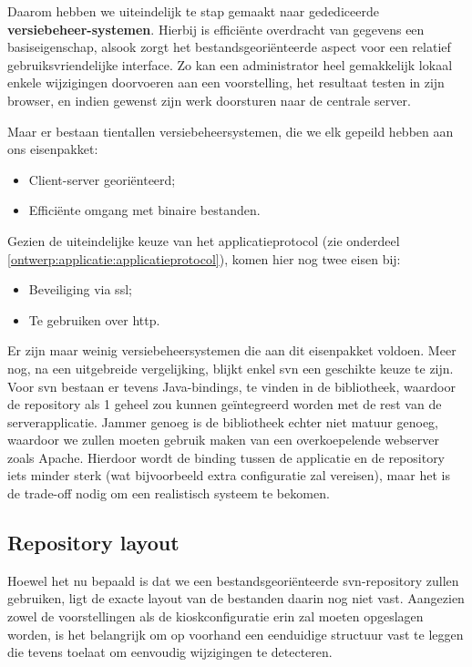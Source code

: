 Daarom hebben we uiteindelijk te stap gemaakt naar gedediceerde \textbf{versiebeheer-systemen}. Hierbij is efficiënte overdracht van gegevens een basiseigenschap, alsook zorgt het bestandsgeoriënteerde aspect voor een relatief gebruiksvriendelijke interface. Zo kan een administrator heel gemakkelijk lokaal enkele wijzigingen doorvoeren aan een voorstelling, het resultaat testen in zijn browser, en indien gewenst zijn werk doorsturen naar de centrale server.

Maar er bestaan tientallen versiebeheersystemen, die we elk gepeild hebben aan ons eisenpakket:
\begin{itemize}
\item Client-server georiënteerd;
\item Efficiënte omgang met binaire bestanden.
\end{itemize}

Gezien de uiteindelijke keuze van het applicatieprotocol (zie onderdeel \ref{ontwerp:applicatie:applicatieprotocol}), komen hier nog twee eisen bij:
\begin{itemize}
\item Beveiliging via \ac{ssl};
\item Te gebruiken over \ac{http}.
\end{itemize}

Er zijn maar weinig versiebeheersystemen die aan dit eisenpakket voldoen. Meer nog, na een uitgebreide vergelijking, blijkt enkel \ac{svn} een geschikte keuze te zijn. Voor \ac{svn} bestaan er tevens Java-bindings, te vinden in de  bibliotheek, waardoor de repository als 1 geheel zou kunnen geïntegreerd worden met de rest van de serverapplicatie. Jammer genoeg is de bibliotheek echter niet matuur genoeg, waardoor we zullen moeten gebruik maken van een overkoepelende webserver zoals Apache. Hierdoor wordt de binding tussen de applicatie en de repository iets minder sterk (wat bijvoorbeeld extra configuratie zal vereisen), maar het is de trade-off nodig om een realistisch systeem te bekomen.

\subsection{Repository layout}

Hoewel het nu bepaald is dat we een bestandsgeoriënteerde \ac{svn}-repository zullen gebruiken, ligt de exacte layout van de bestanden daarin nog niet vast. Aangezien zowel de voorstellingen als de kioskconfiguratie erin zal moeten opgeslagen worden, is het belangrijk om op voorhand een eenduidige structuur vast te leggen die tevens toelaat om eenvoudig wijzigingen te detecteren.

